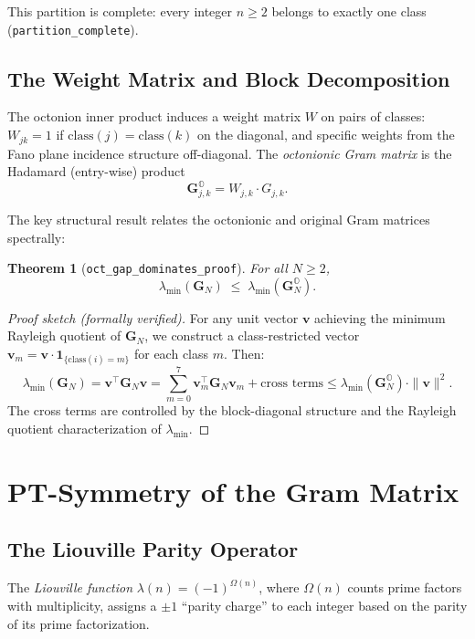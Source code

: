\documentclass[11pt,a4paper]{article}
\newtheorem{theorem}{Theorem}[section]
\theoremstyle{definition}
\theoremstyle{remark}
\newcommand{\Gram}{\mathbf{G}}
\newcommand{\Goct}{\mathbf{G}^{\mathbb{O}}}
\newcommand{\lmin}{\lambda_{\min}}
\newcommand{\lean}[1]{\texttt{#1}}
\begin{document}
This partition is complete: every integer $n \geq 2$ belongs to exactly
one class (\lean{partition\_complete}).

\subsection{The Weight Matrix and Block Decomposition}

The octonion inner product induces a weight matrix $W$ on pairs of classes:
$W_{jk} = 1$ if $\mathrm{class}(j) = \mathrm{class}(k)$ on the diagonal, and
specific weights from the Fano plane incidence structure off-diagonal.
The \emph{octonionic Gram matrix} is the Hadamard (entry-wise) product
\[
  \Goct_{j,k} = W_{j,k} \cdot G_{j,k}.
\]

The key structural result relates the octonionic and original Gram matrices
spectrally:

\begin{theorem}[\lean{oct\_gap\_dominates\_proof}]\label{thm:oct-dom}
For all $N \geq 2$,
\[
  \lmin(\Gram_N) \;\leq\; \lmin(\Goct_N).
\]
\end{theorem}

\begin{proof}[Proof sketch (formally verified)]
For any unit vector $\mathbf{v}$ achieving the minimum Rayleigh quotient
of $\Gram_N$, we construct a class-restricted vector
$\mathbf{v}_m = \mathbf{v} \cdot \mathbf{1}_{\{\mathrm{class}(i)=m\}}$
for each class $m$. Then:
\[
  \lmin(\Gram_N)
  = \mathbf{v}^\top \Gram_N \mathbf{v}
  = \sum_{m=0}^{7} \mathbf{v}_m^\top \Gram_N \mathbf{v}_m
    + \text{cross terms}
  \leq \lmin(\Goct_N) \cdot \|\mathbf{v}\|^2.
\]
The cross terms are controlled by the block-diagonal structure and the
Rayleigh quotient characterization of $\lmin$.
\end{proof}

\section{PT-Symmetry of the Gram Matrix}\label{sec:ptsymmetry}

\subsection{The Liouville Parity Operator}

The \emph{Liouville function} $\lambda(n) = (-1)^{\Omega(n)}$, where
$\Omega(n)$ counts prime factors with multiplicity, assigns a $\pm 1$
``parity charge'' to each integer based on the parity of its prime
factorization.
\end{document}
